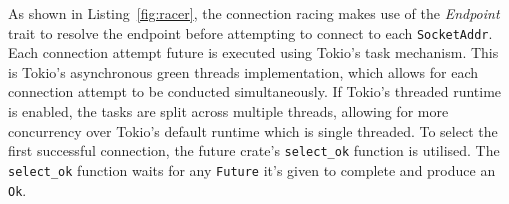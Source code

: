 As shown in Listing~\ref{fig:racer}, the connection racing makes use of the \emph{Endpoint} trait to resolve the
endpoint before attempting to connect to each \texttt{SocketAddr}.
Each connection attempt future is executed using Tokio's task mechanism.
This is Tokio's asynchronous green threads implementation, which allows for each connection attempt to be conducted
simultaneously.
If Tokio's threaded runtime is enabled, the tasks are split across multiple threads, allowing for more concurrency over
Tokio's default runtime which is single threaded.
To select the first successful connection, the future crate's \texttt{select_ok} function is utilised.
The \texttt{select_ok} function waits for any \texttt{Future} it's given to complete and produce an \texttt{Ok}.

%
%
%
%
%
%
%
%
%
%
%
